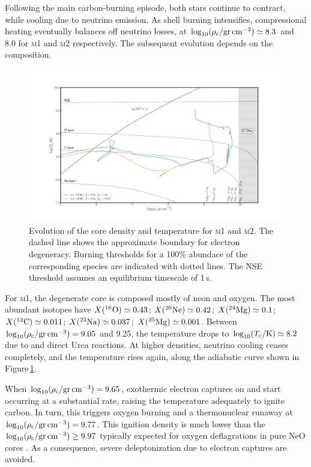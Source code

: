 \documentclass[../../main/thesis_msc.tex]{subfiles}
\begin{document}
Following the main carbon-burning episode, both stars continue to contract, while cooling  due to neutrino  emission. As shell 
burning intensifies, compressional heating eventually balances 
off neutrino losses, at $\logrhoc \simeq 8.3$ and 8.0 for \textsc{m1} and \textsc{m2} respectively. The subsequent evolution depends on the composition. 
\begin{figure}[htb!]
\begin{center}
\includegraphics[width=1.0\textwidth]{../figures/chapter3/Rhoc_vs_Tc.pdf}
\caption{Evolution of the core density and temperature for \textsc{m1} and \textsc{m2}. The dashed line shows the approximate boundary for electron degeneracy. Burning thresholds for a 100\% abundace of the corresponding species are indicated with dotted lines. The NSE threshold assumes an equilibrium timescale of 1\,s.}
\label{fig:2}
\end{center}
\end{figure}
For \textsc{m1}, the degenerate core is composed 
mostly of neon and oxygen. The most abundant isotopes have  $\abun{O}{16}\simeq 0.43$;  $\abun{Ne}{20}\simeq 0.42$; $\abun{Mg}{24}\simeq0.1$;  $\abun{C}{12}\simeq 0.011$; $\abun{Na}{23}\simeq 0.037$; $\abun{Mg}{25}\simeq 0.001$. Between $\logrhoc=9.05$ and 9.25, the temperature drops to $\logtc\simeq 8.2$ due to  and  direct Urca reactions. At higher densities, neutrino cooling ceases completely, and the temperature rises again, along the adiabatic curve shown in Figure\,\ref{fig:2}.  

When $\logrhoc=9.65$, exothermic electron captures on  and 
 start occurring at a substantial rate, raising the temperature 
adequately to ignite carbon. In turn, this triggers oxygen burning and a thermonuclear runaway at  $\logrhoc= 9.77$. This ignition density is much lower than the   $\logrhoc\ge 9.97$ typically expected for oxygen deflagrations  in pure NeO cores \citep{Jones:2018ule}. As a consequence, severe deleptonization due to  electron captures are avoided. 
\end{document}
